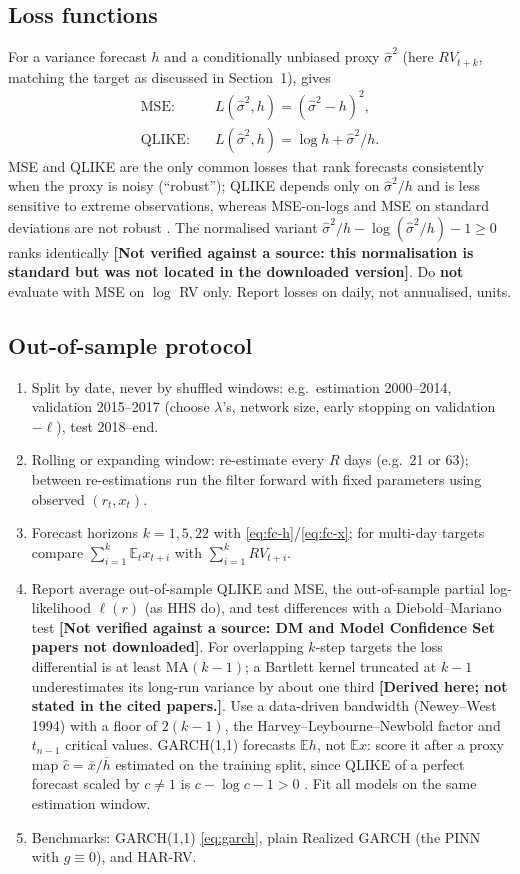 \documentclass[11pt]{article}
\newcommand{\E}{\mathbb{E}}
\newcommand{\unverified}[1]{\textbf{[Not verified against a source: #1]}}
\newcommand{\derived}{\textbf{[Derived here; not stated in the cited papers.]}}
\begin{document}
\subsection{Loss functions}
For a variance forecast $h$ and a conditionally unbiased proxy $\hat\sigma^2$
(here $RV_{t+k}$, matching the target as discussed in Section~1), \cite{Patton2011} gives
\begin{align}
\text{MSE}:\quad & L(\hat\sigma^2,h) = (\hat\sigma^2-h)^2, \label{eq:mse}\\
\text{QLIKE}:\quad & L(\hat\sigma^2,h) = \log h + \hat\sigma^2/h . \label{eq:qlike}
\end{align}
MSE and QLIKE are the only common losses that rank forecasts consistently when the proxy is
noisy (``robust''); QLIKE depends only on $\hat\sigma^2/h$ and is less sensitive to extreme
observations, whereas MSE-on-logs and MSE on standard deviations are not robust
\cite{Patton2011}. The normalised variant $\hat\sigma^2/h-\log(\hat\sigma^2/h)-1\ge0$ ranks
identically \unverified{this normalisation is standard but was not located in the downloaded
version}. Do \textbf{not} evaluate with MSE on $\log$ RV only. Report losses on daily, not
annualised, units.

\subsection{Out-of-sample protocol}
\begin{enumerate}
\item Split by date, never by shuffled windows: e.g.\ estimation 2000--2014, validation
  2015--2017 (choose $\lambda$'s, network size, early stopping on validation $-\ell$),
  test 2018--end.
\item Rolling or expanding window: re-estimate every $R$ days (e.g.\ 21 or 63); between
  re-estimations run the filter forward with fixed parameters using observed $(r_t,x_t)$.
\item Forecast horizons $k=1,5,22$ with \eqref{eq:fc-h}/\eqref{eq:fc-x}; for multi-day
  targets compare $\sum_{i=1}^k\E_t x_{t+i}$ with $\sum_{i=1}^k RV_{t+i}$.
\item Report average out-of-sample QLIKE and MSE, the out-of-sample partial log-likelihood
  $\ell(r)$ (as HHS do), and test differences with a Diebold--Mariano test
  \unverified{DM and Model Confidence Set papers not downloaded}. For overlapping $k$-step
  targets the loss differential is at least MA$(k-1)$; a Bartlett kernel truncated at $k-1$
  underestimates its long-run variance by about one third \derived. Use a data-driven
  bandwidth (Newey--West 1994) with a floor of $2(k-1)$, the Harvey--Leybourne--Newbold factor
  and $t_{n-1}$ critical values. GARCH(1,1) forecasts $\E h$, not $\E x$: score it after a
  proxy map $\hat c=\overline{x}/\overline{h}$ estimated on the training split, since QLIKE
  of a perfect forecast scaled by $c\neq1$ is $c-\log c-1>0$ \cite{Patton2011}. Fit all
  models on the same estimation window.
\item Benchmarks: GARCH(1,1) \eqref{eq:garch}, plain Realized GARCH (the PINN with $g\equiv0$),
  and HAR-RV.
\end{enumerate}
\end{document}
